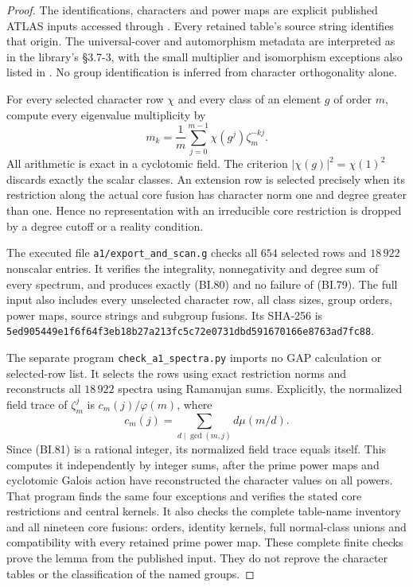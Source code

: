 \begin{proof}
The identifications, characters and power maps are explicit
published ATLAS inputs accessed through \cite{SPOR:CTblLib}.
Every retained table's source string identifies that origin.
The universal-cover and automorphism metadata are interpreted as
in the library's \S3.7-3, with the small multiplier and isomorphism
exceptions also listed in \cite[Chapter~5, Tables~1--2,
numbered pp.~35--36]{BI:HHM}.  No group identification is inferred
from character orthogonality alone.

For every selected character row $\chi$ and every class of an
element $g$ of order $m$, compute every eigenvalue multiplicity by
\[
 m_k=\frac1m\sum_{j=0}^{m-1}\chi(g^j)\zeta_m^{-kj}.
                                                               \tag{BI.81}
\]
All arithmetic is exact in a cyclotomic field.  The criterion
$|\chi(g)|^2=\chi(1)^2$ discards exactly the scalar classes.
An extension row is selected precisely when its restriction along
the actual core fusion has character norm one and degree greater
than one.  Hence no representation with an irreducible core
restriction is dropped by a degree cutoff or a reality condition.

The executed file \texttt{a1/export\_and\_scan.g} checks all
$654$ selected rows and $18\,922$ nonscalar entries.  It verifies
the integrality, nonnegativity and degree sum of every spectrum,
and produces exactly (BI.80) and no failure of (BI.79).  The full
input also includes every unselected character row, all class
sizes, group orders, power maps, source strings and subgroup
fusions.  Its SHA-256 is
\texttt{5ed905449e1f6f64f3eb18b27a213fc5c72e0731dbd591670166e8763ad7fc88}.

The separate program \texttt{check\_a1\_spectra.py} imports no GAP
calculation or selected-row list.  It selects the rows using exact
restriction norms and reconstructs all $18\,922$ spectra using
Ramanujan sums.  Explicitly, the normalized field trace of
$\zeta_m^j$ is $c_m(j)/\varphi(m)$, where
\[
                 c_m(j)=\sum_{d\mid\gcd(m,j)}d\mu(m/d).
\]
Since (BI.81) is a rational integer, its normalized field trace
equals itself.  This computes it independently by integer sums,
after the prime power maps and cyclotomic Galois action have
reconstructed the character values on all powers.  That program
finds the same four exceptions and verifies the stated core
restrictions and central kernels.  It also checks the complete
table-name inventory and all nineteen core fusions: orders,
identity kernels, full normal-class unions and compatibility
with every retained prime power map.  These complete finite checks
prove the lemma from the published input.  They do not reprove
the character tables or the classification of the named groups.
\end{proof}

